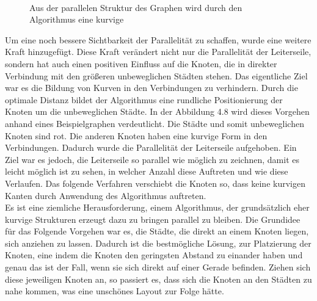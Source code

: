 \begin{figure}[t]
{	}
	\\
	\caption[Aus der parallelen Struktur des Graphen wird durch den Algorithmus eine kurvige]{Aus der parallelen Struktur des Graphen wird durch den Algorithmus eine kurvige}
	\label{fig_testbild2}
\end{figure}

Um eine noch bessere Sichtbarkeit der Parallelität zu schaffen, wurde eine weitere Kraft hinzugefügt. Diese Kraft verändert nicht nur die Parallelität der Leiterseile, sondern hat auch einen positiven Einfluss auf die Knoten, die in direkter Verbindung mit den größeren unbeweglichen Städten stehen. Das eigentliche Ziel war es die Bildung von Kurven in den Verbindungen zu verhindern. Durch die optimale Distanz bildet der Algorithmus eine rundliche Positionierung der Knoten um die unbeweglichen Städte. In der Abbildung 4.8 wird dieses Vorgehen anhand eines Beispielgraphen verdeutlicht. Die Städte und somit unbeweglichen Knoten sind rot. Die anderen Knoten haben eine kurvige Form in den Verbindungen. Dadurch wurde die Parallelität der Leiterseile aufgehoben. Ein Ziel war es jedoch, die Leiterseile so parallel wie möglich zu zeichnen, damit es leicht möglich ist zu sehen, in welcher Anzahl diese Auftreten und wie diese Verlaufen. Das folgende Verfahren verschiebt die Knoten so, dass keine kurvigen Kanten durch Anwendung des Algorithmus auftreten. \\

Es ist eine ziemliche Herausforderung, einem Algorithmus, der grundsätzlich eher kurvige Strukturen erzeugt dazu zu bringen parallel zu bleiben. Die Grundidee für das Folgende Vorgehen war es, die Städte, die direkt an einem Knoten liegen, sich anziehen zu lassen. Dadurch ist die bestmögliche Lösung, zur Platzierung der Knoten, eine indem die Knoten den geringsten Abstand zu einander haben und genau das ist der Fall, wenn sie sich direkt auf einer Gerade befinden. Ziehen sich diese jeweiligen Knoten an, so passiert es, dass sich die Knoten an den Städten zu nahe kommen, was eine unschönes Layout zur Folge hätte. \\

